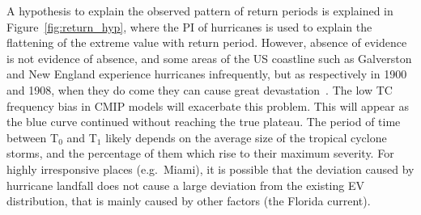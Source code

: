 A hypothesis to explain the observed pattern of return periods is explained in
Figure~\ref{fig:return_hyp}, where the PI of hurricanes is used to
explain the flattening of the extreme value with return period.
However, absence of evidence is not evidence of absence, and some areas of the US
coastline such as Galverston and New England experience hurricanes infrequently,
but as respectively in 1900 and 1908,
 when they do come they can cause great devastation~\cite{emanuel2005divine}.
The low TC frequency bias in CMIP models will exacerbate this problem. This will
appear as the blue curve continued without reaching the true plateau. The period of time
between T$_0$ and T$_1$ likely depends on the average size of the tropical cyclone storms, and the
percentage of them which rise to their maximum severity.
For highly irresponsive places (e.g.~Miami), it is possible that the deviation caused
by hurricane landfall does not cause a large deviation from the existing EV distribution,
that is mainly caused by other factors (the Florida current).







\FloatBarrier
